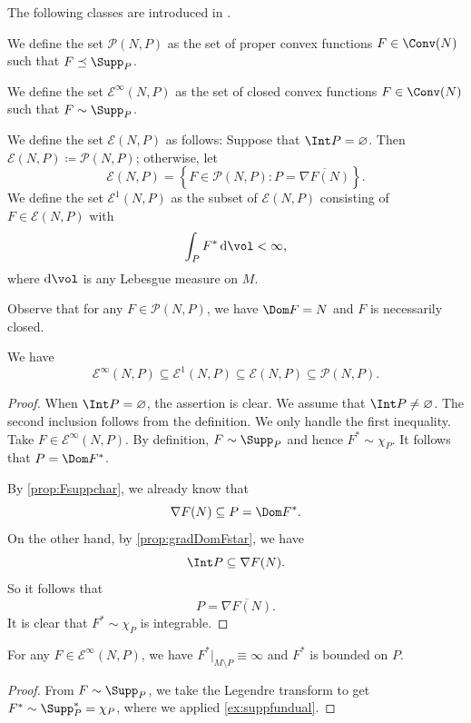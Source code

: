 The following classes are introduced in \cite{BB13}.
\begin{definition}\label{def:convexPfunctions}
    We define the set $\mathcal{P}(N,P)$ as the set of proper convex functions $F\in \Conv(N)$ such that $F\preceq \Supp_P$.

    We define the set $\mathcal{E}^{\infty}(N,P)$ as the set of closed convex functions $F\in \Conv(N)$ such that $F\sim \Supp_P$.

    We define the set $\mathcal{E}(N,P)$ as follows: Suppose that $\Int P=\varnothing$. Then $\mathcal{E}(N,P)\coloneqq \mathcal{P}(N,P)$; otherwise, let
    \[
    \mathcal{E}(N,P)=\left\{F\in \mathcal{P}(N,P) : P=\overline{\nabla F(N)} \right\}.
    \]
    We define the set $\mathcal{E}^1(N,P)$ as the subset of $\mathcal{E}(N,P)$ consisting of $F\in \mathcal{E}(N,P)$ with
    \[
    \int_P F^*\,\mathrm{d}\vol<\infty,
    \]
    where $\mathrm{d}\vol$ is any Lebesgue measure on $M$.
\end{definition}
Observe that for any $F\in \mathcal{P}(N,P)$, we have $\Dom F=N$ and $F$ is necessarily closed.

\begin{proposition}\label{prop:convex:L415}
We have
\[
\mathcal{E}^{\infty}(N,P)\subseteq \mathcal{E}^{1}(N,P)\subseteq \mathcal{E}(N,P) \subseteq \mathcal{P}(N,P).
\]
\end{proposition}
\begin{proof}
    When $\Int P=\varnothing$, the assertion is clear. We assume that $\Int P\neq \varnothing$. The second inclusion follows from the definition. We only handle the first inequality. Take $F\in \mathcal{E}^{\infty}(N,P)$. By definition, $F\sim \Supp_P$ and hence $F^*\sim \chi_P$. It follows that $P=\Dom F^*$.

    By \cref{prop:Fsuppchar}, we already know that
    \[
    \nabla F(N)\subseteq P=\Dom F^*.
    \]
    On the other hand, by \cref{prop:gradDomFstar}, we have
    \[
    \Int P\subseteq \nabla F(N).
    \]
    So it follows that
    \[
    P=\overline{\nabla F(N)}.
    \]
    It is clear that $F^*\sim \chi_P$ is integrable.
\end{proof}


\begin{proposition}\label{prop:convex:L440}
    For any $F\in \mathcal{E}^{\infty}(N,P)$, we have $F^*|_{M\setminus P}\equiv \infty$ and $F^*$ is bounded on $P$.
\end{proposition}
\begin{proof}
    From $F\sim \Supp_P$, we take the Legendre transform to get $F^*\sim \Supp_P^*=\chi_P$, where we applied \cref{ex:suppfundual}.
\end{proof}




